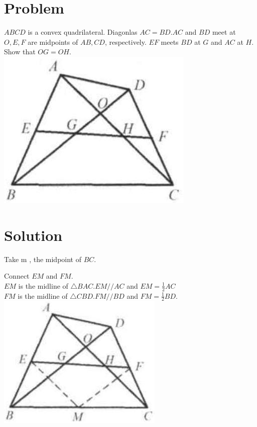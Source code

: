 \documentclass{article}
\begin{document}
\section*{Problem}
\(A B C D\) is a convex quadrilateral. Diagonlas \(A C=B D . A C\) and \(B D\) meet at \(O, E, F\) are midpoints of \(A B, C D\), respectively. \(E F\) meets \(B D\) at \(G\) and \(A C\) at \(H\). Show that \(O G=O H\).\\
\centering
\includegraphics[width=\textwidth]{images/046.jpg}

\section*{Solution}
Take m , the midpoint of \(B C\).


Connect \(E M\) and \(F M\).\\
\(E M\) is the midline of \(\triangle B A C . E M / / A C\) and \(E M=\frac{1}{2} A C\)\\
\(F M\) is the midline of \(\triangle C B D . F M / / B D\) and \(F M=\frac{1}{2} B D\).\\
\centering
\includegraphics[width=\textwidth]{images/052.jpg}
\end{document}
